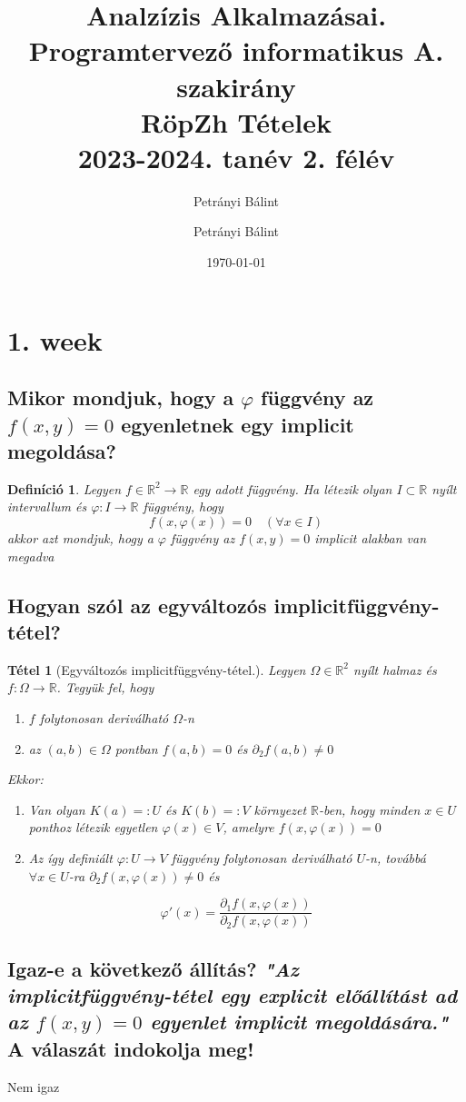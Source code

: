 \documentclass[12pt,a4paper]{article}
\author{Petrányi Bálint}\usepackage[pdfusetitle]{hyperref}
\date{\today}
\author{Petrányi Bálint}
\title{%
	\textbf{Analzízis Alkalmazásai.} \\
	\textbf{Programtervező informatikus A. szakirány} \\
	RöpZh Tételek\\
	\large 2023-2024. tanév 2. félév
}
\newcommand{\R}{\mathbb{R}}
\newcommand{\f}{\varphi}
\newtheorem{tet}{Tétel}[section]
\newtheorem{defi}{Definíció}[section]
\begin{document}
\maketitle
\tableofcontents
\newpage
\section{1. week}
\subsection{Mikor mondjuk, hogy a $\f$ függvény az $f(x, y) = 0$ egyenletnek egy implicit megoldása?}
\begin{defi}
Legyen $f \in \R^2 \rightarrow \R$ egy adott függvény. Ha létezik olyan $I \subset \R$ nyílt intervallum és $\f : I \rightarrow \R$ függvény, hogy 
\[
f(x,\f(x)) = 0 \quad (\forall x \in I)
\]
akkor azt mondjuk, hogy a $\f$ függvény az $f(x, y) = 0$ implicit alakban van megadva
\end{defi}
\subsection{Hogyan szól az egyváltozós implicitfüggvény-tétel?}
\begin{tet}[Egyváltozós implicitfüggvény-tétel.]
Legyen $\Omega \in \R^2$ nyílt halmaz és $f : \Omega \rightarrow \R$. Tegyük fel, hogy
\begin{enumerate}
\item[(a)] $f$  folytonosan deriválható $\Omega$-n
\item[(b)] az $(a,b) \in \Omega$ pontban $f(a,b) = 0 $ és $\partial_2 f(a,b) \neq 0$
\end{enumerate}
Ekkor:
\begin{enumerate}
\item Van olyan $K(a) =: U$ és $K(b) =: V$ környezet $\R$-ben, hogy minden $x \in U$ ponthoz létezik egyetlen $\f(x) \in V$, amelyre $f(x, \f(x)) = 0$
\item Az így definiált $\f : U \rightarrow V$ függvény folytonosan deriválható $U$-n, továbbá $\forall x \in U$-ra  $\partial_2 f(x,\f(x)) \neq 0$ és
\end{enumerate}
\[
\f'(x) = \frac{\partial_1 f (x,\f(x))}{\partial_2 f(x,\f(x))}
\]
\end{tet}
\subsection{Igaz-e a következő állítás? \textit{"Az implicitfüggvény-tétel egy explicit előállítást ad az $f(x, y) = 0$ egyenlet implicit megoldására."} A válaszát indokolja meg!}
Nem igaz
\end{document}
